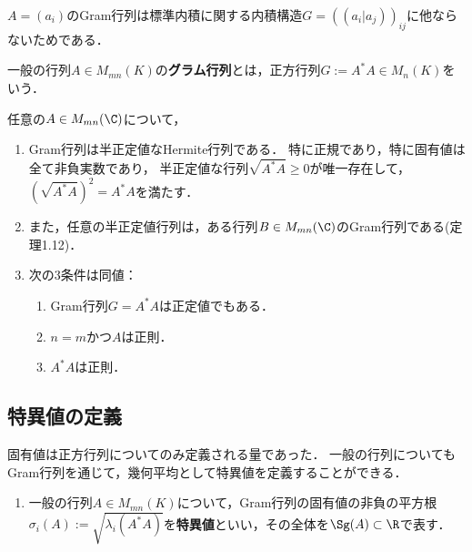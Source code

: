 \documentclass[uplatex, dvipdfmx]{jsreport}
\begin{document}
\begin{tcolorbox}[colframe=ForestGreen, colback=ForestGreen!10!white,breakable,colbacktitle=ForestGreen!40!white,coltitle=black,fonttitle=\bfseries\sffamily,
title=]
    $A=(a_i)$のGram行列は標準内積に関する内積構造$G=((a_i|a_j))_{ij}$に他ならないためである．
\end{tcolorbox}

\begin{definition}
    一般の行列$A\in M_{mn}(K)$の\textbf{グラム行列}とは，正方行列$G:=A^*A\in M_{n}(K)$をいう．
\end{definition}

\begin{proposition}[Gram行列の性質]
    任意の$A\in M_{mn}(\C)$について，
    \begin{enumerate}
        \item Gram行列は半正定値なHermite行列である．
        特に正規であり，特に固有値は全て非負実数であり，
        半正定値な行列$\sqrt{A^*A}\ge0$が唯一存在して，$(\sqrt{A^*A})^2=A^*A$を満たす．
        \item また，任意の半正定値行列は，ある行列$B\in M_{mn}(\C)$のGram行列である\cite{柳井-竹内-一般逆行列}(定理1.12)．
        \item 次の3条件は同値：
        \begin{enumerate}
            \item Gram行列$G=A^*A$は正定値でもある．
            \item $n=m$かつ$A$は正則．
            \item $A^*A$は正則．
        \end{enumerate}
    \end{enumerate}
\end{proposition}

\subsection{特異値の定義}

\begin{tcolorbox}[colframe=ForestGreen, colback=ForestGreen!10!white,breakable,colbacktitle=ForestGreen!40!white,coltitle=black,fonttitle=\bfseries\sffamily,
title=]
    固有値は正方行列についてのみ定義される量であった．
    一般の行列についてもGram行列を通じて，幾何平均として特異値を定義することができる．
\end{tcolorbox}

\begin{definition}\mbox{}
    \begin{enumerate}
        \item 一般の行列$A\in M_{mn}(K)$について，Gram行列の固有値の非負の平方根
        $\sigma_i(A):=\sqrt{\lambda_i(A^*A)}$を\textbf{特異値}といい，その全体を$\Sg(A)\subset\R$で表す．
    \end{enumerate}
\end{definition}
\end{document}
